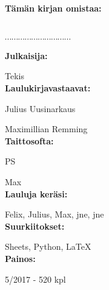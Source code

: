 \noindent\textbf{Tämän kirjan omistaa:}
\\
\\
\\
$\cdots\cdots\cdots\cdots\cdots\cdots\cdots\cdots\cdots\cdots$
\\
\newpage

\textbf{Julkaisija:}

Tekis
\\


\textbf{Laulukirjavastaavat:}

Julius Uusinarkaus

Maximillian Remming
\\

\textbf{Taittosofta:}

PS

Max
\\

\textbf{Lauluja keräsi:}

Felix, Julius, Max, jne, jne 
\\

\textbf{Suurkiitokset:}

Sheets, Python, \LaTeX
\\

\textbf{Painos:}

5/2017 - 520 kpl

\newpage